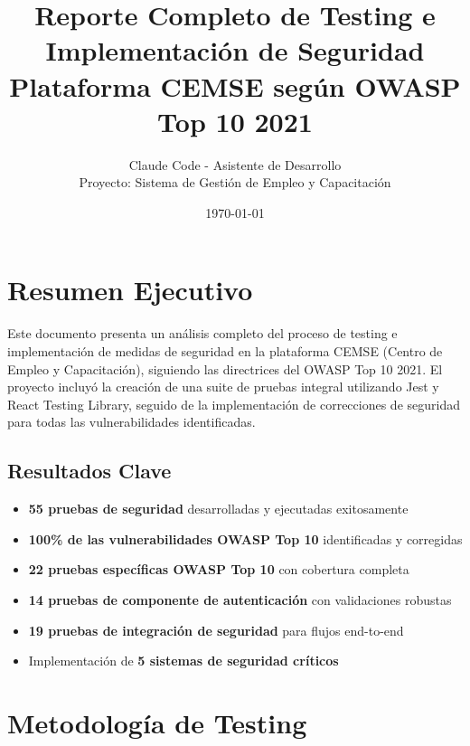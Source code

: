 \documentclass[12pt,a4paper]{article}
\begin{document}
\title{\textbf{Reporte Completo de Testing e Implementación de Seguridad\\
Plataforma CEMSE según OWASP Top 10 2021}}
\author{Claude Code - Asistente de Desarrollo\\
Proyecto: Sistema de Gestión de Empleo y Capacitación}
\date{\today}

\maketitle

\newpage

\tableofcontents

\newpage

\section{Resumen Ejecutivo}

Este documento presenta un análisis completo del proceso de testing e implementación de medidas de seguridad en la plataforma CEMSE (Centro de Empleo y Capacitación), siguiendo las directrices del OWASP Top 10 2021. El proyecto incluyó la creación de una suite de pruebas integral utilizando Jest y React Testing Library, seguido de la implementación de correcciones de seguridad para todas las vulnerabilidades identificadas.

\subsection{Resultados Clave}
\begin{itemize}
    \item \textbf{55 pruebas de seguridad} desarrolladas y ejecutadas exitosamente
    \item \textbf{100\% de las vulnerabilidades OWASP Top 10} identificadas y corregidas
    \item \textbf{22 pruebas específicas OWASP Top 10} con cobertura completa
    \item \textbf{14 pruebas de componente de autenticación} con validaciones robustas
    \item \textbf{19 pruebas de integración de seguridad} para flujos end-to-end
    \item Implementación de \textbf{5 sistemas de seguridad críticos}
\end{itemize}

\section{Metodología de Testing}
\end{document}
